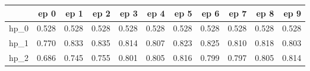 \begin{tabular}{lrrrrrrrrrr}
\toprule
{} &   ep 0 &   ep 1 &   ep 2 &   ep 3 &   ep 4 &   ep 5 &   ep 6 &   ep 7 &   ep 8 &   ep 9 \\
\midrule
hp\_0 &  0.528 &  0.528 &  0.528 &  0.528 &  0.528 &  0.528 &  0.528 &  0.528 &  0.528 &  0.528 \\
hp\_1 &  0.770 &  0.833 &  0.835 &  0.814 &  0.807 &  0.823 &  0.825 &  0.810 &  0.818 &  0.803 \\
hp\_2 &  0.686 &  0.745 &  0.755 &  0.801 &  0.805 &  0.816 &  0.799 &  0.797 &  0.805 &  0.814 \\
\bottomrule
\end{tabular}
